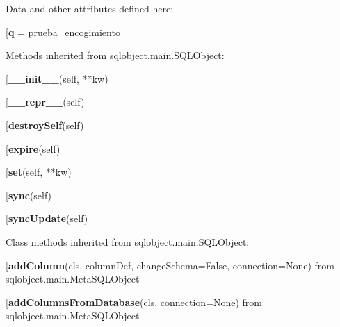 Data and other attributes defined here:\\
\begin{description}\item[{\bf q} = prueba\_encogimiento\end{description}


Methods inherited from sqlobject.main.SQLObject:\\
\begin{description}\item[{\bf \_\_init\_\_}(self, **kw)\end{description}

\begin{description}\item[{\bf \_\_repr\_\_}(self)\end{description}

\begin{description}\item[{\bf destroySelf}(self)\end{description}

\begin{description}\item[{\bf expire}(self)\end{description}

\begin{description}\item[{\bf set}(self, **kw)\end{description}

\begin{description}\item[{\bf sync}(self)\end{description}

\begin{description}\item[{\bf syncUpdate}(self)\end{description}


Class methods inherited from sqlobject.main.SQLObject:\\
\begin{description}\item[{\bf addColumn}(cls, columnDef, changeSchema=False, connection=None) from sqlobject.main.MetaSQLObject\end{description}

\begin{description}\item[{\bf addColumnsFromDatabase}(cls, connection=None) from sqlobject.main.MetaSQLObject\end{description}

